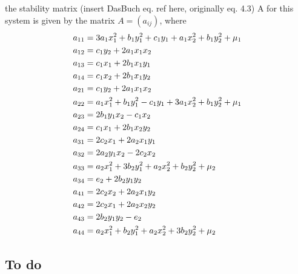 \documentclass{article}
\begin{document}
the stability matrix ({insert DasBuch eq. ref here, originally eq. 4.3}) A for this 				system is given by the matrix $A=(a_{ij})$, where
\begin{align}
a_{11}&=3 a_1 x_1^2 + b_1 y_1^2 + c_1 y_1 + a_1 x_2^2 + b_1 y_2^2 + \mu_1\\
a_{12}&=c_1 y_2 + 2 a_1 x_1 x_2\\
a_{13}&=c_1 x_1 + 2 b_1 x_1 y_1\\
a_{14}&=c_1 x_2 + 2 b_1 x_1 y_2\\
a_{21}&=c_1 y_2 + 2 a_1 x_1 x_2\\
a_{22}&=a_1 x_1^2 + b_1 y_1^2 - c_1 y_1 + 3 a_1 x_2^2 + b_1 y_2^2 + \mu_1\\
a_{23}&=2 b_1 y_1 x_2 - c_1 x_2\\
a_{24}&=c_1 x_1 + 2 b_1 x_2 y_2\\
a_{31}&=2 c_2 x_1 + 2 a_2 x_1 y_1\\
a_{32}&=2 a_2 y_1 x_2 - 2 c_2 x_2\\
a_{33}&=a_2 x_1^2 + 3 b_2 y_1^2 + a_2 x_2^2 + b_2 y_2^2 + \mu_2\\
a_{34}&=e_2 + 2 b_2 y_1 y_2\\
a_{41}&= 2 c_2 x_2 + 2 a_2 x_1 y_2\\
a_{42}&=2 c_2 x_1 + 2 a_2 x_2 y_2\\
a_{43}&= 2 b_2 y_1 y_2 - e_2\\
a_{44}&=a_2 x_1^2 + b_2 y_1^2 + a_2 x_2^2 + 3 b_2 y_2^2 + \mu_2
\label{{2modeStabMatrix}}
\end{align}


\subsection{To do}
\label{s:ToDo}
\end{document}
